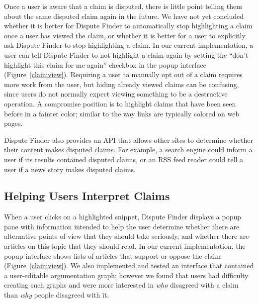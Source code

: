 \documentclass{www2010-submission}
\newcommand{\todo}[1]{}
\begin{document}
Once a user is aware that a claim is disputed, there is little point telling them about the same disputed claim again in the future. We have not yet concluded whether it is better for Dispute Finder to automatically stop highlighting a claim once a user has viewed the claim, or whether it is better for a user to explicitly ask Dispute Finder to stop highlighting a claim. In our current implementation, a user can tell Dispute Finder to not highlight a claim again by setting the ``don't highlight this claim for me again'' checkbox in the popup interface (Figure~\ref{claimview}). Requiring a user to manually opt out of a claim requires more work from the user, but hiding already viewed claims can be confusing, since users do not normally expect viewing something to be a destructive operation. A compromise position is to highlight claims that have been seen before in a fainter color; similar to the way links are typically colored on web pages.

\todo{Try using a fainter color}

\todo{Text is wrong in the screenshot}

Dispute Finder also provides an API that allows other sites to determine whether their content makes disputed claims. For example, a search engine could inform a user if its results contained disputed claims, or an RSS feed reader could tell a user if a news story makes disputed claims.

\todo{Document API online}
\todo{Change the highlight color to yellow? Auto-adjust highlight color based on background color?}
\todo{Should we automatically adjust the highlight color, based on the background color of the page}
\todo{Discuss previous work on highlighting here, rather than in related work?}



\subsection{Helping Users Interpret Claims}

When a user clicks on a highlighted snippet, Dispute Finder displays a popup pane with information intended to help the user determine whether there are alternative points of view that they should take seriously, and whether there are articles on this topic that they should read. In our current implementation, the popup interface shows lists of articles that support or oppose the claim (Figure~\ref{claimview}). We also implemented and tested an interface that contained a user-editable argumentation graph; however we found that users had difficulty creating such graphs and were more interested in {\it who} disagreed with a claim than {\it why} people disagreed with it.
\end{document}

